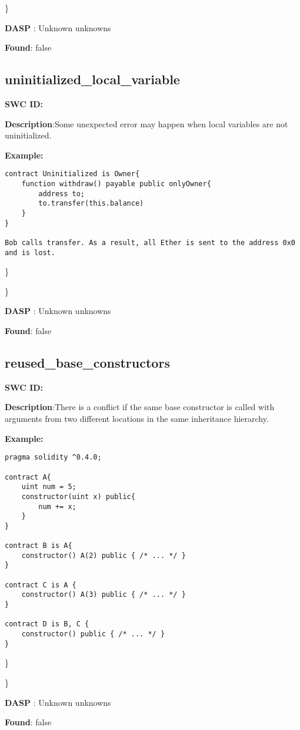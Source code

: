 \documentclass{article}
\begin{document}
\} 

\textbf{DASP} : Unknown unknowns

\textbf{Found}: false

\subsection{uninitialized\_local\_variable} 
\textbf{SWC \textunderscore ID:} 

\textbf{Description}:Some unexpected error may happen when local variables are not uninitialized.


\textbf{Example:} 
\begin{verbatim}
contract Uninitialized is Owner{
    function withdraw() payable public onlyOwner{
        address to;
        to.transfer(this.balance)
    }
}

Bob calls transfer. As a result, all Ether is sent to the address 0x0 and is lost.

\end{verbatim}\} 

\} 

\textbf{DASP} : Unknown unknowns

\textbf{Found}: false

\subsection{reused\_base\_constructors} 
\textbf{SWC \textunderscore ID:} 

\textbf{Description}:There is a conflict if the same base constructor is called with arguments from two different locations in the same inheritance hierarchy.


\textbf{Example:} 
\begin{verbatim}
pragma solidity ^0.4.0;

contract A{
    uint num = 5;
    constructor(uint x) public{
        num += x;
    }
}

contract B is A{
    constructor() A(2) public { /* ... */ }
}

contract C is A {
    constructor() A(3) public { /* ... */ }
}

contract D is B, C {
    constructor() public { /* ... */ }
}

\end{verbatim}\} 

\} 

\textbf{DASP} : Unknown unknowns

\textbf{Found}: false
\end{document}
